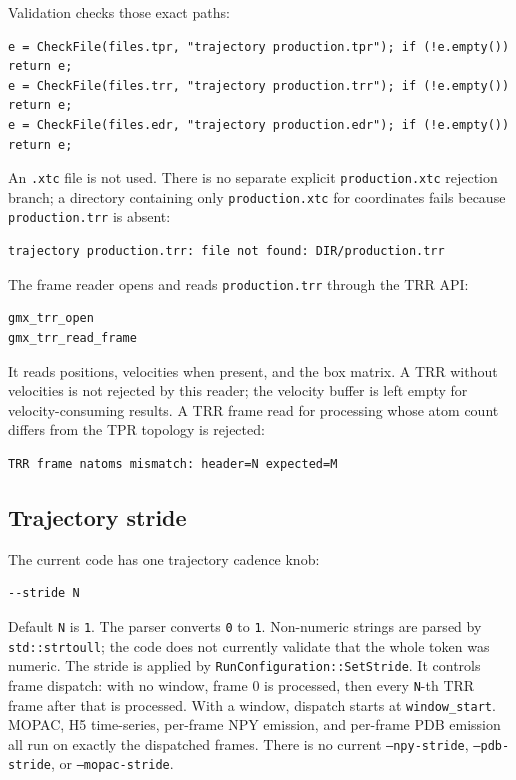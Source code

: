 \documentclass[11pt]{article}
\begin{document}
Validation checks those exact paths:

\begin{lstlisting}
e = CheckFile(files.tpr, "trajectory production.tpr"); if (!e.empty()) return e;
e = CheckFile(files.trr, "trajectory production.trr"); if (!e.empty()) return e;
e = CheckFile(files.edr, "trajectory production.edr"); if (!e.empty()) return e;
\end{lstlisting}

An \texttt{.xtc} file is not used. There is no separate explicit
\texttt{production.xtc} rejection branch; a directory containing only
\texttt{production.xtc} for coordinates fails because
\texttt{production.trr} is absent:

\begin{lstlisting}
trajectory production.trr: file not found: DIR/production.trr
\end{lstlisting}

The frame reader opens and reads \texttt{production.trr} through the TRR API:

\begin{lstlisting}
gmx_trr_open
gmx_trr_read_frame
\end{lstlisting}

It reads positions, velocities when present, and the box matrix. A TRR without
velocities is not rejected by this reader; the velocity buffer is left empty
for velocity-consuming results. A TRR frame read for processing whose atom
count differs from the TPR topology is rejected:

\begin{lstlisting}
TRR frame natoms mismatch: header=N expected=M
\end{lstlisting}

\subsection{Trajectory stride}

The current code has one trajectory cadence knob:

\begin{lstlisting}
--stride N
\end{lstlisting}

Default \texttt{N} is \texttt{1}. The parser converts \texttt{0} to
\texttt{1}. Non-numeric strings are parsed by \texttt{std::strtoull}; the code
does not currently validate that the whole token was numeric. The stride is
applied by \texttt{RunConfiguration::SetStride}. It controls frame dispatch:
with no window, frame 0 is processed, then every \texttt{N}-th TRR frame after
that is processed. With a window, dispatch starts at \texttt{window\_start}.
MOPAC, H5 time-series, per-frame NPY emission, and per-frame PDB emission all
run on exactly the dispatched frames. There is no current
\texttt{--npy-stride}, \texttt{--pdb-stride}, or \texttt{--mopac-stride}.
\end{document}
